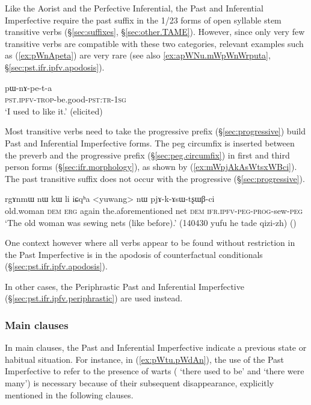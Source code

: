 Like the Aorist and the Perfective Inferential, the Past and Inferential Imperfective require the past suffix  in the 1/2\fl{}3 forms of open syllable stem transitive verbs (§\ref{sec:suffixes}, §\ref{sec:other.TAME}). However, since only very few transitive verbs are compatible with these two categories, relevant examples such as (\ref{ex:pWnApeta}) are very rare (see also \ref{ex:apWNu.mWpWnWrputa}, §\ref{sec:pst.ifr.ipfv.apodosis}).

\begin{exe}
\ex \label{ex:pWnApeta}
\gll pɯ-nɤ-pe-t-a \\
\textsc{pst}.\textsc{ipfv}-\textsc{trop}-be.good-\textsc{pst}:\textsc{tr}-\textsc{1sg} \\
\glt `I used to like it.' (elicited)
\end{exe}


Most transitive verbs need to take the progressive  prefix (§\ref{sec:progressive}) build Past and Inferential Imperfective forms. The peg circumfix  is inserted between the  preverb and the progressive prefix (§\ref{sec:peg.circumfix}) in first and third person forms (§\ref{sec:ifr.morphology}), as shown by (\ref{ex:mWpjAkAsWtsxWBci}). The past transitive suffix  does not occur with the progressive (§\ref{sec:progressive}).

\begin{exe}
\ex \label{ex:mWpjAkAsWtsxWBci}
\gll  rgɤnmɯ nɯ kɯ li iɕqʰa <yuwang> nɯ pjɤ-k-ɤsɯ-tʂɯβ-ci \\
old.woman \textsc{dem} \textsc{erg} again the.aforementioned net \textsc{dem} \textsc{ifr}.\textsc{ipfv}-\textsc{peg}-\textsc{prog}-sew-\textsc{peg} \\
\glt `The old woman was sewing nets (like before).' (140430 yufu he tade qizi-zh)
()
\end{exe}

One context however where all verbs appear to be found without restriction in the Past Imperfective is in the apodosis of counterfactual conditionals (§\ref{sec:pst.ifr.ipfv.apodosis}).

In other cases, the Periphrastic Past and Inferential Imperfective (§\ref{sec:pst.ifr.ipfv.periphrastic}) are used instead.
 
\subsubsection{Main clauses} \label{sec:pst.ifr.ipfv.main}
In main clauses, the Past and Inferential Imperfective indicate a previous state or habitual situation. For instance, in (\ref{ex:pWtu.pWdAn}), the use of the Past Imperfective to refer to the presence of warts ( `there used to be' and  `there were many') is necessary because of their subsequent disappearance, explicitly mentioned in the following clauses.

